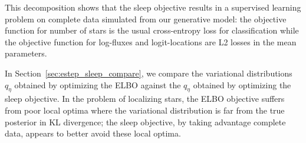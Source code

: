 This decomposition shows that the sleep objective results in a supervised learning problem on complete data simulated from our generative model: the objective function for number of stars is the usual cross-entropy loss for classification while the objective function for log-fluxes and logit-locations are L2 losses in the mean parameters. 

In Section~\ref{sec:estep_sleep_compare}, 
we compare the variational distributions $q_\eta$ 
obtained by optimizing the ELBO against the $q_\eta$ obtained by optimizing the sleep objective.
In the problem of localizing stars,
the ELBO objective suffers from poor local optima where the variational distribution is far from the true posterior in KL divergence; the sleep objective, by taking advantage complete data, appears to better avoid these local optima. 




